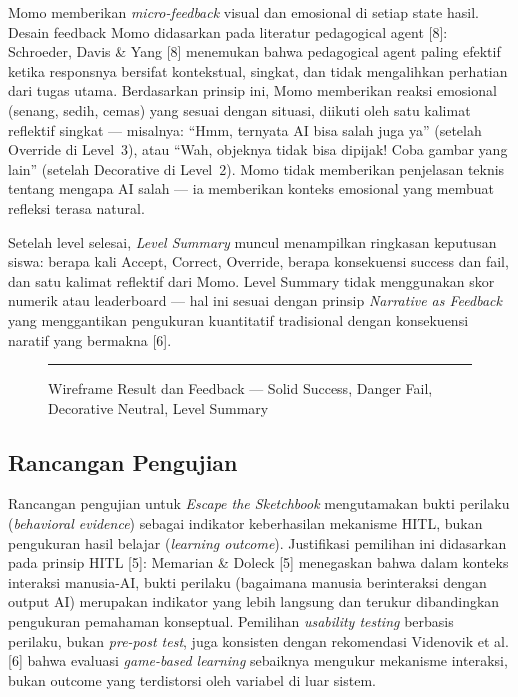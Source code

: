 \documentclass[12pt,oneside]{report}
\begin{document}
Momo memberikan \textit{micro-feedback} visual dan emosional di setiap state hasil. Desain feedback Momo didasarkan pada literatur pedagogical agent [8]: Schroeder, Davis \& Yang [8] menemukan bahwa pedagogical agent paling efektif ketika responsnya bersifat kontekstual, singkat, dan tidak mengalihkan perhatian dari tugas utama. Berdasarkan prinsip ini, Momo memberikan reaksi emosional (senang, sedih, cemas) yang sesuai dengan situasi, diikuti oleh satu kalimat reflektif singkat --- misalnya: ``Hmm, ternyata AI bisa salah juga ya'' (setelah Override di Level~3), atau ``Wah, objeknya tidak bisa dipijak! Coba gambar yang lain'' (setelah Decorative di Level~2). Momo tidak memberikan penjelasan teknis tentang mengapa AI salah --- ia memberikan konteks emosional yang membuat refleksi terasa natural.

Setelah level selesai, \textit{Level Summary} muncul menampilkan ringkasan keputusan siswa: berapa kali Accept, Correct, Override, berapa konsekuensi success dan fail, dan satu kalimat reflektif dari Momo. Level Summary tidak menggunakan skor numerik atau leaderboard --- hal ini sesuai dengan prinsip \textit{Narrative as Feedback} yang menggantikan pengukuran kuantitatif tradisional dengan konsekuensi naratif yang bermakna [6].

\begin{figure}[H]
    \centering
    \rule{0.9\textwidth}{6cm}
    \caption{Wireframe Result dan Feedback --- Solid Success, Danger Fail, Decorative Neutral, Level Summary}
    \label{fig:wireframe-result-feedback}
\end{figure}


\subsection{Rancangan Pengujian}
\label{subsec:rancangan-pengujian}

Rancangan pengujian untuk \textit{Escape the Sketchbook} mengutamakan bukti perilaku (\textit{behavioral evidence}) sebagai indikator keberhasilan mekanisme HITL, bukan pengukuran hasil belajar (\textit{learning outcome}). Justifikasi pemilihan ini didasarkan pada prinsip HITL [5]: Memarian \& Doleck [5] menegaskan bahwa dalam konteks interaksi manusia-AI, bukti perilaku (bagaimana manusia berinteraksi dengan output AI) merupakan indikator yang lebih langsung dan terukur dibandingkan pengukuran pemahaman konseptual. Pemilihan \textit{usability testing} berbasis perilaku, bukan \textit{pre-post test}, juga konsisten dengan rekomendasi Videnovik et al. [6] bahwa evaluasi \textit{game-based learning} sebaiknya mengukur mekanisme interaksi, bukan outcome yang terdistorsi oleh variabel di luar sistem.
\end{document}
